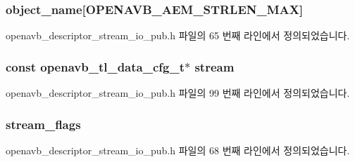\subsubsection[{\texorpdfstring{object\+\_\+name}{object_name}}]{ object\+\_\+name\mbox{[}{\bf O\+P\+E\+N\+A\+V\+B\+\_\+\+A\+E\+M\+\_\+\+S\+T\+R\+L\+E\+N\+\_\+\+M\+AX}\mbox{]}}\hypertarget{structopenavb__aem__descriptor__stream__io__t_a5e98aba8105a7a6d82fac41816c83da3}{}\label{structopenavb__aem__descriptor__stream__io__t_a5e98aba8105a7a6d82fac41816c83da3}


openavb\+\_\+descriptor\+\_\+stream\+\_\+io\+\_\+pub.\+h 파일의 65 번째 라인에서 정의되었습니다.

\subsubsection[{\texorpdfstring{stream}{stream}}]{\setlength{\rightskip}{0pt plus 5cm}const {\bf openavb\+\_\+tl\+\_\+data\+\_\+cfg\+\_\+t}$\ast$ stream}\hypertarget{structopenavb__aem__descriptor__stream__io__t_a4dc1fffc055ad41dc931468c7916665f}{}\label{structopenavb__aem__descriptor__stream__io__t_a4dc1fffc055ad41dc931468c7916665f}


openavb\+\_\+descriptor\+\_\+stream\+\_\+io\+\_\+pub.\+h 파일의 99 번째 라인에서 정의되었습니다.

\subsubsection[{\texorpdfstring{stream\+\_\+flags}{stream_flags}}]{ stream\+\_\+flags}\hypertarget{structopenavb__aem__descriptor__stream__io__t_adf77ed09927f6496f24b6d69a686b194}{}\label{structopenavb__aem__descriptor__stream__io__t_adf77ed09927f6496f24b6d69a686b194}


openavb\+\_\+descriptor\+\_\+stream\+\_\+io\+\_\+pub.\+h 파일의 68 번째 라인에서 정의되었습니다.

